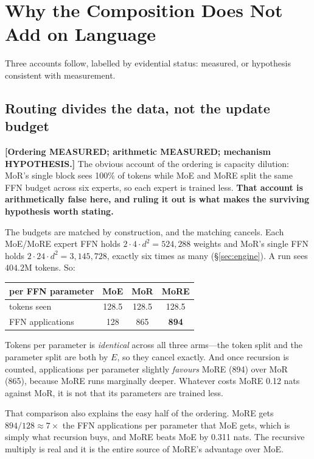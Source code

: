 \section{Why the Composition Does Not Add on Language}
\label{sec:mechanism}

Three accounts follow, labelled by evidential status: measured, or hypothesis
consistent with measurement.

\subsection{Routing divides the data, not the update budget}
\label{sec:dilution}

\textbf{[Ordering MEASURED; arithmetic MEASURED; mechanism HYPOTHESIS.]} The
obvious account of the ordering is capacity dilution: MoR's single block sees
100\% of tokens while MoE and MoRE split the same FFN budget across six experts,
so each expert is trained less. \textbf{That account is arithmetically false
here, and ruling it out is what makes the surviving hypothesis worth stating.}

The budgets are matched by construction, and the matching cancels. Each MoE/MoRE
expert FFN holds $2 \cdot 4 \cdot d^2 = 524{,}288$ weights and MoR's single FFN
holds $2 \cdot 24 \cdot d^2 = 3{,}145{,}728$, exactly six times as many
(\S\ref{sec:engine}). A run sees $404.2$M tokens. So:

\begin{center}
{\dispsize
\setlength{\tabcolsep}{9pt}\renewcommand{\arraystretch}{1.25}
\small
\begin{tabular}{lccc}
\toprule
per FFN parameter & MoE & MoR & MoRE \\
\midrule
tokens seen      & 128.5 & 128.5 & 128.5 \\
FFN applications & 128   & 865   & \textbf{894} \\
\bottomrule
\end{tabular}
}
\end{center}

Tokens per parameter is \emph{identical} across all three arms---the token split
and the parameter split are both by $E$, so they cancel exactly. And once
recursion is counted, applications per parameter slightly \emph{favours} MoRE
(894) over MoR (865), because MoRE runs marginally deeper. Whatever costs MoRE
0.12 nats against MoR, it is not that its parameters are trained less.

That comparison also explains the easy half of the ordering. MoRE gets
$894/128 \approx 7\times$ the FFN applications per parameter that MoE gets, which
is simply what recursion buys, and MoRE beats MoE by 0.311 nats. The recursive
multiply is real and it is the entire source of MoRE's advantage over MoE.

